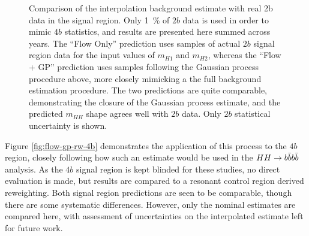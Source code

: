 \begin{figure}
\centering
	\caption{\label{fig:flow-gp-2b} Comparison of the interpolation background estimate with 
	real 2b data in the signal region. Only 1~\% of $2b$ data is used in order to mimic $4b$ statistics, 
	and results are presented here summed across years. The ``Flow Only'' prediction uses samples of 
	actual $2b$ signal region data for the input values of $m_{H1}$ and $m_{H2}$, whereas the ``Flow + GP'' 
	prediction uses samples following the Gaussian process procedure above, more closely mimicking a 
	the full background estimation procedure. The two predictions are quite comparable, demonstrating the 
	closure of the Gaussian process estimate, and the predicted $m_{HH}$ shape agrees well with $2b$ data. 
	Only $2b$ statistical uncertainty is shown.}
\end{figure}


Figure \ref{fig:flow-gp-rw-4b} demonstrates the application of this process to the $4b$ region, 
closely following how such an estimate would be used in the $HH\rightarrow b\bar{b}b\bar{b}$ analysis. As the 
$4b$ signal region is kept blinded for these studies, no direct evaluation is made, but results 
are compared to a resonant control region derived reweighting. Both signal region predictions are 
seen to be comparable, though there are some systematic differences. However, only the nominal 
estimates are compared here, with assessment of uncertainties on the interpolated estimate 
left for future work.

